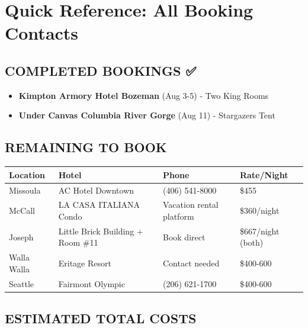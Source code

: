 \documentclass[
  11pt,
]{article}
\providecommand{\tightlist}{%
  \setlength{\itemsep}{0pt}\setlength{\parskip}{0pt}}
\begin{document}
\newpage

\section{\texorpdfstring{\textcolor{primary}{Quick Reference: All Booking Contacts}}{}}\label{section-53}

\subsection{\texorpdfstring{\textcolor{secondary}{COMPLETED BOOKINGS ✅}}{}}\label{section-54}

\begin{itemize}
\tightlist
\item
  \textbf{\textcolor{primary}{Kimpton Armory Hotel Bozeman}} (Aug 3-5) -
  Two King Rooms
\item
  \textbf{\textcolor{primary}{Under Canvas Columbia River Gorge}} (Aug
  11) - Stargazers Tent
\end{itemize}

\subsection{\texorpdfstring{\textcolor{secondary}{REMAINING TO BOOK}}{}}\label{section-55}

\begin{table}[H]
\centering
\begin{tabular}{|l|l|l|l|}
\hline
\textbf{Location} & \textbf{Hotel} & \textbf{Phone} & \textbf{Rate/Night} \\
\hline
\textcolor{primary}{Missoula} & AC Hotel Downtown & (406) 541-8000 & \$455 \\
\hline
\textcolor{primary}{McCall} & LA CASA ITALIANA Condo & Vacation rental platform & \$360/night \\
\hline
\textcolor{primary}{Joseph} & Little Brick Building + Room \#11 & Book direct & \$667/night (both) \\
\hline
\textcolor{primary}{Walla Walla} & Eritage Resort & Contact needed & \$400-600 \\
\hline
\textcolor{primary}{Seattle} & Fairmont Olympic & (206) 621-1700 & \$400-600 \\
\hline
\end{tabular}
\end{table}

\subsection{\texorpdfstring{\textcolor{secondary}{ESTIMATED TOTAL COSTS}}{}}\label{section-56}
\end{document}
